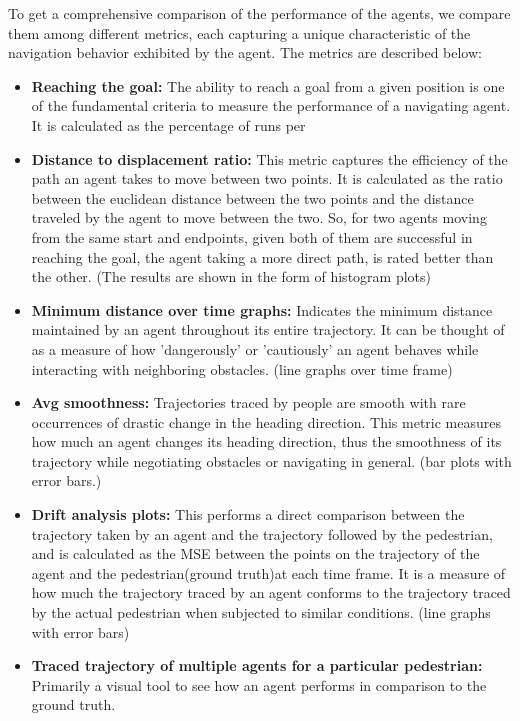 To get a comprehensive comparison of the performance of the agents, we compare them among different metrics, each capturing a unique characteristic of the navigation behavior exhibited by the agent. The metrics are described below:
\begin{itemize}
        \item \textbf{Reaching the goal:} The ability to reach a goal from a given position is one of the fundamental criteria to measure the performance of a navigating agent. It is calculated as the percentage of runs per 
        \item \textbf{Distance to displacement ratio:} This metric captures the efficiency of the path an agent takes to move between two points. It is calculated as the ratio between the euclidean distance between the two points and the distance traveled by the agent to move between the two. So, for two agents moving from the same start and endpoints, given both of them are successful in reaching the goal, the agent taking a more direct path, is rated better than the other. (The results are shown in the form of histogram plots)
        \item \textbf{Minimum distance over time graphs:} Indicates the minimum distance maintained by an agent throughout its entire trajectory. It can be thought of as a measure of how 'dangerously' or 'cautiously' an agent behaves while interacting with neighboring obstacles. (line graphs over time frame)
        \item \textbf{Avg smoothness:} Trajectories traced by people are smooth with rare occurrences of drastic change in the heading direction. This metric measures how much an agent changes its heading direction, thus the smoothness of its trajectory while negotiating obstacles or navigating in general. (bar plots with error bars.)
        \item \textbf{Drift analysis plots: }This performs a direct comparison between the trajectory taken by an agent and the trajectory followed by the pedestrian, and is calculated as the MSE between the points on the trajectory of the agent and the pedestrian(ground truth)at each time frame. It is a measure of how much the trajectory traced by an agent conforms to the trajectory traced by the actual pedestrian when subjected to similar conditions. (line graphs with error bars)
        \item \textbf{Traced trajectory of multiple agents for a particular pedestrian:} Primarily a visual tool to see how an agent performs in comparison to the ground truth.
\end{itemize}

